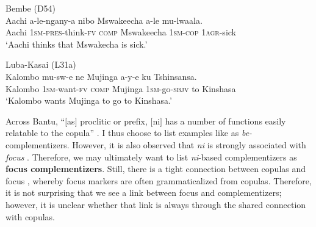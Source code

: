 \documentclass[output=paper,colorlinks,citecolor=brown,
]{langscibook}
\begin{document}
\ea\label{ex:gluckman:ni.comp}
	\begin{xlist}
	\ex \label{ex:gluckman:ni.comp1} Bembe (D54) \\
\gll Aachi a-le-ngany-a nibo Mswakeecha a-le mu-lwaala.\\
Aachi 1\textsc{sm}-\textsc{pres}-think-\textsc{fv} \textsc{comp} Mswakeecha 1\textsc{sm}-\textsc{cop} 1\textsc{agr}-sick\\
\glt `Aachi thinks that Mswakecha is sick.' 
	
	\ex \label{ex:gluckman:ni.comp2} Luba-Kasai (L31a) \\
	\gll Kalombo mu-sw-e ne Mujinga a-y-e ku Tshinsansa.\\
	Kalombo 1\textsc{sm}-want-\textsc{fv} \textsc{comp} Mujinga 1\textsc{sm}-go-\textsc{sbjv} to Kinshasa\\
	\glt `Kalombo wants Mujinga to go to Kinshasa.' 
	\end{xlist}
\z

 Across Bantu, ``$[$as$]$ proclitic or prefix, $[$ni$]$ has a number of functions easily relatable to the copula''  \citep[53]{Nurse:2008}. I thus choose to list examples like  as \textit{be-}complementizers. However, it is also  observed that \textit{ni} is strongly associated with \textit{focus} \citep{Nurse:2008, Guldemann:2013}. Therefore, we may ultimately want to list \textit{ni}-based complementizers as \textbf{focus complementizers}. Still, there is a tight connection between copulas and focus  \citep[125]{Kutevaetal:2019}, whereby focus markers are often grammaticalized from copulas. Therefore, it is not surprising that we see a link between focus and complementizers; however, it is unclear whether that link is always through the shared connection with copulas. 
 
\end{document}
